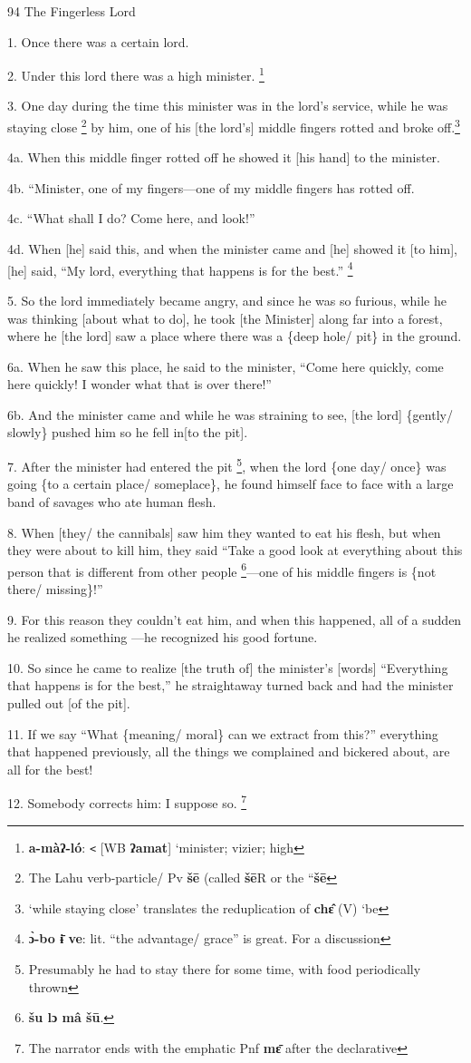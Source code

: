 
94 The Fingerless Lord

1. Once there was a certain lord.

2. Under this lord there was a high minister. \footnote{\textbf{a-màʔ-ló}: \texttt{<} [WB \textbf{ʔamat}] `minister; vizier; high}

3. One day during the time this minister was in the lord's service, while he was
staying close \footnote{The Lahu verb-particle/ Pv \textbf{šē} (called \textbf{šē}R or the ``\textbf{šē}} by him, one of his [the lord's] middle fingers rotted and broke
off.\footnote{`while staying close' translates the reduplication of \textbf{chɛ̂} (V) `be}

4a. When this middle finger rotted off he showed it [his hand] to the minister.

4b. ``Minister, one of my fingers---one of my middle fingers has rotted off.

4c. ``What shall I do? Come here, and look!''

4d. When [he] said this, and when the minister came and [he] showed it [to him],
[he] said, ``My lord, everything that happens is for the best.'' \footnote{\textbf{ɔ̀-bo ɨ̄ ve}: lit. ``the advantage/ grace'' is great. For a discussion}

5. So the lord immediately became angry, and since he was so furious, while he
was thinking [about what to do], he took [the Minister] along far into a forest,
where he [the lord] saw a place where there was a \{deep hole/ pit\} in the ground.

6a. When he saw this place, he said to the minister, ``Come here quickly, come
here quickly!  I wonder what that is over there!''

6b. And the minister came and while he was straining to see, [the lord] \{gently/
slowly\} pushed him so he fell in[to the pit].

7. After the minister had entered the pit \footnote{Presumably he had to stay there for some time, with food periodically thrown}, when the lord \{one day/ once\}
was going \{to a certain place/ someplace\}, he found himself face to face with
a large band of savages who ate human flesh.

8. When [they/ the cannibals] saw him they wanted to eat his flesh, but when they
were about to kill him, they said ``Take a good look at everything about this person
that is different from other people \footnote{\textbf{šu lɔ  mâ  šū}.}---one of his middle fingers is \{not there/
missing\}!''

9. For this reason they couldn't eat him, and when this happened, all of a sudden
he realized something ---he recognized his good fortune.

10. So since he came to realize [the truth of] the minister's [words] ``Everything
that happens is for the best,'' he straightaway turned back and had the minister
pulled out [of the pit].

11. If we say ``What \{meaning/ moral\} can we extract from this?'' everything
that happened previously, all the things we complained and bickered about, are
all for the best!

12. Somebody corrects him: I suppose so. \footnote{The narrator ends with the emphatic Pnf \textbf{mɛ̄} after the declarative}

